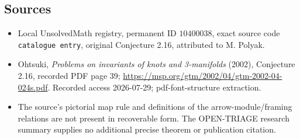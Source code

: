 \documentclass[11pt]{article}
\begin{document}
\subsection{Sources}
\begin{itemize}
\item Local UnsolvedMath registry, permanent ID \(10400038\), exact source code \texttt{catalogue entry}, original Conjecture 2.16, attributed to M. Polyak.
\item Ohtsuki, \emph{Problems on invariants of knots and 3-manifolds} (2002), Conjecture 2.16, recorded PDF page 39; \url{https://msp.org/gtm/2002/04/gtm-2002-04-024s.pdf}. Recorded access 2026-07-29; pdf-font-structure extraction.
\item The source's pictorial map rule and definitions of the arrow-module/framing relations are not present in recoverable form. The OPEN-TRIAGE research summary supplies no additional precise theorem or publication citation.
\end{itemize}
\end{document}
